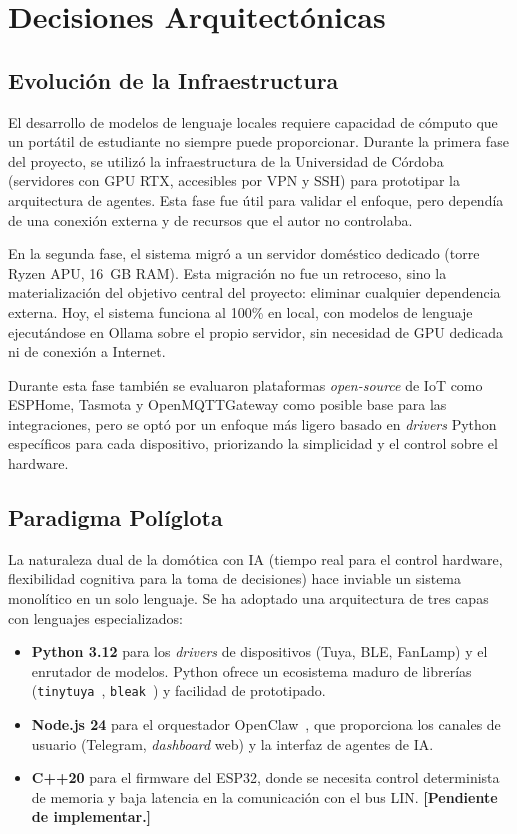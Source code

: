 \section{Decisiones Arquitectónicas}

\subsection{Evolución de la Infraestructura}

El desarrollo de modelos de lenguaje locales requiere capacidad de cómputo que un portátil de estudiante no siempre puede proporcionar. Durante la primera fase del proyecto, se utilizó la infraestructura de la Universidad de Córdoba (servidores con GPU RTX, accesibles por VPN y SSH) para prototipar la arquitectura de agentes. Esta fase fue útil para validar el enfoque, pero dependía de una conexión externa y de recursos que el autor no controlaba.

En la segunda fase, el sistema migró a un servidor doméstico dedicado (torre Ryzen APU, 16~GB RAM). Esta migración no fue un retroceso, sino la materialización del objetivo central del proyecto: eliminar cualquier dependencia externa. Hoy, el sistema funciona al 100\% en local, con modelos de lenguaje ejecutándose en Ollama sobre el propio servidor, sin necesidad de GPU dedicada ni de conexión a Internet.

Durante esta fase también se evaluaron plataformas \textit{open-source} de IoT como ESPHome, Tasmota y OpenMQTTGateway como posible base para las integraciones, pero se optó por un enfoque más ligero basado en \textit{drivers} Python específicos para cada dispositivo, priorizando la simplicidad y el control sobre el hardware.

\subsection{Paradigma Políglota}

La naturaleza dual de la domótica con IA (tiempo real para el control hardware, flexibilidad cognitiva para la toma de decisiones) hace inviable un sistema monolítico en un solo lenguaje. Se ha adoptado una arquitectura de tres capas con lenguajes especializados:

\begin{itemize}
    \item \textbf{Python 3.12} para los \textit{drivers} de dispositivos (Tuya, BLE, FanLamp) y el enrutador de modelos. Python ofrece un ecosistema maduro de librerías (\texttt{tinytuya}~\cite{tinytuya}, \texttt{bleak}~\cite{bleak}) y facilidad de prototipado.
    \item \textbf{Node.js 24} para el orquestador OpenClaw~\cite{openclaw}, que proporciona los canales de usuario (Telegram, \textit{dashboard} web) y la interfaz de agentes de IA.
    \item \textbf{C++20} para el firmware del ESP32, donde se necesita control determinista de memoria y baja latencia en la comunicación con el bus LIN. \textbf{[Pendiente de implementar.]}
\end{itemize}

